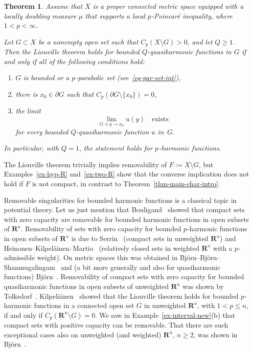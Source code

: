 \documentclass[a4paper,twoside]{article}
\theoremstyle{propositional}
\newtheorem{thm}{Theorem}[section]
\theoremstyle{descriptive}
\theoremstyle{remarkstyle}
\newcommand{\setm}{\setminus}
\newcommand{\Cp}{{C_p}}
\newcommand{\bdry}{\partial}
\newcommand{\bdy}{\bdry}
\newcommand{\p}{{$p\mspace{1mu}$}}
\newcommand{\Rn}{\mathbf{R}^n}
\numberwithin{equation}{section}
\begin{document}
\begin{thm} \label{thm-LL-F}
Assume that   $X$ is a proper connected metric space
equipped with a locally doubling measure $\mu$ that
supports a local \p-Poincar\'e inequality, where $1<p<\infty$.

Let $G \subset X$ be  a nonempty open set such that
$\Cp(X \setm G)>0$, and let $Q \ge 1$.
Then the Liouville theorem holds for bounded
$Q$-quasiharmonic functions in $G$ 
if and only if all of the following conditions hold\textup:
\begin{enumerate}
\renewcommand{\theenumi}{\textup{(\roman{enumi})}}%
\item  \label{Lio-par}
$G$ is bounded or a \p-parabolic set\/ 
\textup(see~\eqref{eq-par-set-int}\textup),
\item \label{Lio-cap}
there is $x_0 \in \bdy G$ such that $\Cp(\bdy G \setm \{x_0\})=0$,
\item \label{Lio-lim}
the limit 
\begin{equation*} %
\lim_{G \ni y \to x_0} u(y) \quad \text{exists}
\end{equation*}
for every bounded $Q$-quasiharmonic function $u$ in~$G$.
\end{enumerate}
In particular, with $Q=1$, the statement holds for \p-harmonic functions.
\end{thm}

The Liouville theorem trivially implies removability
of $F:=X \setm G$, but 
Examples~\ref{ex-hyp-R} and~\ref{ex-two-R} show
that the converse implication does not hold if $F$ is not compact,
in contrast to Theorem~\ref{thm-main-char-intro}.





Removable singularities for bounded harmonic functions is a classical topic
in potential theory.
Let us just mention that Bouligand~\cite[p.~104]{Bouligand26} showed that 
compact sets 
with zero capacity are removable for bounded
harmonic functions in open subsets of $\Rn$.
Removability of sets with zero capacity 
for bounded \p-harmonic functions in open subsets of $\Rn$
is due to Serrin~\cite[Theorem~10]{serrin64} (compact sets in unweighted $\Rn$)
and
Hei\-no\-nen--Kil\-pe\-l\"ai\-nen--Martio~\cite[Theorem~7.36]{HeKiMa} (relatively closed sets
in weighted $\Rn$ with a \p-admissible weight).
On metric spaces this  was obtained in
Bj\"orn--Bj\"orn--Shan\-mu\-ga\-lin\-gam~\cite[Proposition~8.3]{BBS2}
and (a bit more generally and also for quasiharmonic functions) 
Bj\"orn~\cite[Theorem~6.2]{ABremove}.
Removability of compact sets with
zero capacity for bounded quasiharmonic 
functions in open subsets of unweighted $\Rn$ was shown
by Tolksdorf~\cite[Theorem~1.5]{tolksdorf}.
Kilpel\"ainen~\cite[Theorem~1.8]{Kilp89} showed 
that the Liouville theorem holds for bounded \p-harmonic functions
in a connected open set $G$ in unweighted $\Rn$, with $1<p\le n$, if and only if
$\Cp(\Rn \setm G)=0$.
We saw in Example~\ref{ex-interval-new}(b)
that compact sets with positive capacity can be removable.
That there are such exceptional cases also on unweighted (and weighted) $\Rn$, 
$n \ge 2$, was shown in Bj\"orn~\cite[Theorems~1.2--1.3] {ABRnremove}.
\end{document}
